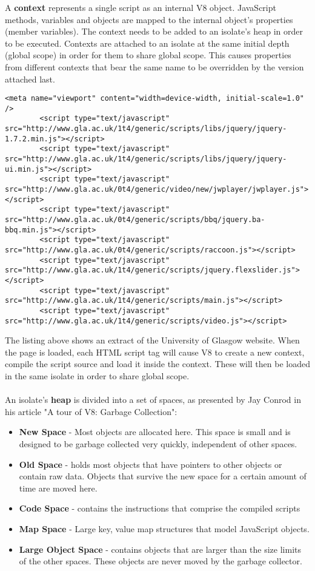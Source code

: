 \documentclass{l4proj}
\begin{document}
\newpage
A \textbf{context} represents a single script as an internal V8 object. JavaScript methods, variables and objects are mapped to the internal object's properties (member variables). The context needs to be added to an isolate's heap in order to be executed. Contexts are attached to an isolate at the same initial depth (global scope) in order for them to share global scope. This causes properties from different contexts that bear the same name to be overridden by the version attached last. 
\begin{lstlisting}[style=htmlcssjs]
 <meta name="viewport" content="width=device-width, initial-scale=1.0" />
        <script type="text/javascript" src="http://www.gla.ac.uk/1t4/generic/scripts/libs/jquery/jquery-1.7.2.min.js"></script>
        <script type="text/javascript" src="http://www.gla.ac.uk/1t4/generic/scripts/libs/jquery/jquery-ui.min.js"></script>
        <script type="text/javascript" src="http://www.gla.ac.uk/0t4/generic/video/new/jwplayer/jwplayer.js"></script>
        <script type="text/javascript" src="http://www.gla.ac.uk/0t4/generic/scripts/bbq/jquery.ba-bbq.min.js"></script>
        <script type="text/javascript" src="http://www.gla.ac.uk/0t4/generic/scripts/raccoon.js"></script>
        <script type="text/javascript" src="http://www.gla.ac.uk/1t4/generic/scripts/jquery.flexslider.js"></script>
        <script type="text/javascript" src="http://www.gla.ac.uk/1t4/generic/scripts/main.js"></script>
        <script type="text/javascript" src="http://www.gla.ac.uk/1t4/generic/scripts/video.js"></script>
\end{lstlisting}
The listing above shows an extract of the University of Glasgow website. When the page is loaded, each HTML script tag will cause V8 to create a new context, compile the script source and load it inside the context. These will then be loaded in the same isolate in order to share global scope.
\\\\
An isolate's \textbf{heap} is divided into a set of spaces, as presented by Jay Conrod in his article "A tour of V8: Garbage Collection"\cite{v8gctour}:
\begin{itemize}
\item \textbf{New Space} - Most objects are allocated here. This space is small and is designed to be garbage collected very quickly, independent of other spaces. 
\item \textbf{Old Space} - holds most objects that have pointers to other objects or contain raw data. Objects that survive the new space for a certain amount of time are moved here.  
\item \textbf{Code Space} - contains the instructions that comprise the compiled scripts
\item \textbf{Map Space} - Large key, value map structures that model JavaScript objects.
\item \textbf{Large Object Space} - contains objects that are larger than the size limits of the other spaces. These objects are never moved by the garbage collector.
\end{itemize}
\end{document}
